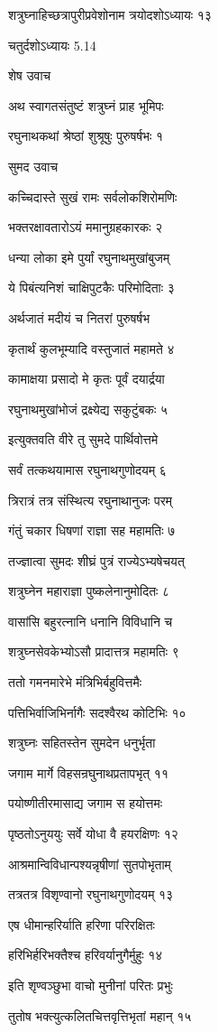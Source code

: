 शत्रुघ्नाहिच्छत्रापुरीप्रवेशोनाम त्रयोदशोऽध्यायः १३

चतुर्दशोऽध्यायः 5.14

शेष उवाच

अथ स्वागतसंतुष्टं शत्रुघ्नं प्राह भूमिपः

रघुनाथकथां श्रेष्ठां शुश्रूषुः पुरुषर्षभः १

सुमद उवाच

कच्चिदास्ते सुखं रामः सर्वलोकशिरोमणिः

भक्तरक्षावतारोऽयं ममानुग्रहकारकः २

धन्या लोका इमे पुर्यां रघुनाथमुखांबुजम्

ये पिबंत्यनिशं चाक्षिपुटकैः परिमोदिताः ३

अर्थजातं मदीयं च नितरां पुरुषर्षभ

कृतार्थं कुलभूम्यादि वस्तुजातं महामते ४

कामाक्षया प्रसादो मे कृतः पूर्वं दयार्द्रया

रघुनाथमुखांभोजं द्रक्ष्येद्य सकुटुंबकः ५

इत्युक्तवति वीरे तु सुमदे पार्थिवोत्तमे

सर्वं तत्कथयामास रघुनाथगुणोदयम् ६

त्रिरात्रं तत्र संस्थित्य रघुनाथानुजः परम्

गंतुं चकार धिषणां राज्ञा सह महामतिः ७

तज्ज्ञात्वा सुमदः शीघ्रं पुत्रं राज्येऽभ्यषेचयत्

शत्रुघ्नेन महाराज्ञा पुष्कलेनानुमोदितः ८

वासांसि बहुरत्नानि धनानि विविधानि च

शत्रुघ्नसेवकेभ्योऽसौ प्रादात्तत्र महामतिः ९

ततो गमनमारेभे मंत्रिभिर्बहुवित्तमैः

पत्तिभिर्वाजिभिर्नागैः सदश्वैरथ कोटिभिः १०

शत्रुघ्नः सहितस्तेन सुमदेन धनुर्भृता

जगाम मार्गे विहसन्रघुनाथप्रतापभृत् ११

पयोष्णीतीरमासाद्य जगाम स हयोत्तमः

पृष्ठतोऽनुययुः सर्वे योधा वै हयरक्षिणः १२

आश्रमान्विविधान्पश्यन्नृषीणां सुतपोभृताम्

तत्रतत्र विशृण्वानो रघुनाथगुणोदयम् १३

एष धीमान्हरिर्याति हरिणा परिरक्षितः

हरिभिर्हरिभक्तैश्च हरिवर्यानुगैर्मुहुः १४

इति शृण्वञ्छुभा वाचो मुनीनां परितः प्रभुः

तुतोष भक्त्युत्कलितचित्तवृत्तिभृतां महान् १५

